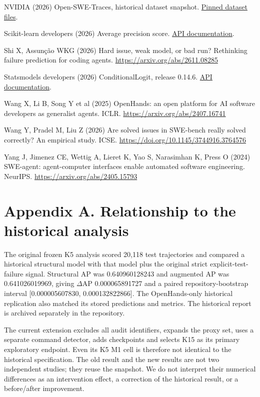 \documentclass[10pt,a4paper]{article}
\begin{document}
NVIDIA (2026) Open-SWE-Traces, historical dataset snapshot. \href{https://huggingface.co/datasets/nvidia/Open-SWE-Traces/tree/c144d9d160dcd9f5ebcd9520d2d54111dda8b681}{Pinned dataset files}.

Scikit-learn developers (2026) Average precision score. \href{https://scikit-learn.org/stable/modules/generated/sklearn.metrics.average_precision_score.html}{API documentation}.

Shi X, Assun\c{c}\~ao WKG (2026) Hard issue, weak model, or bad run? Rethinking failure prediction for coding agents. \url{https://arxiv.org/abs/2611.08285}

Statsmodels developers (2026) ConditionalLogit, release 0.14.6. \href{https://www.statsmodels.org/v0.14.6/generated/statsmodels.discrete.conditional_models.ConditionalLogit.html}{API documentation}.

Wang X, Li B, Song Y et al (2025) OpenHands: an open platform for AI software developers as generalist agents. ICLR. \url{https://arxiv.org/abs/2407.16741}

Wang Y, Pradel M, Liu Z (2026) Are solved issues in SWE-bench really solved correctly? An empirical study. ICSE. \url{https://doi.org/10.1145/3744916.3764576}

Yang J, Jimenez CE, Wettig A, Lieret K, Yao S, Narasimhan K, Press O (2024) SWE-agent: agent-computer interfaces enable automated software engineering. NeurIPS. \url{https://arxiv.org/abs/2405.15793}

\section{Appendix A. Relationship to the historical analysis}
The original frozen K5 analysis scored 20,118 test trajectories and compared a historical structural model with that model plus the original strict explicit-test-failure signal. Structural AP was 0.640960128243 and augmented AP was 0.641026019969, giving $\Delta$AP 0.000065891727 and a paired repository-bootstrap interval [0.000005607830, 0.000132822866]. The OpenHands-only historical replication also matched its stored predictions and metrics. The historical report is archived separately in the repository.

The current extension excludes all audit identifiers, expands the proxy set, uses a separate command detector, adds checkpoints and selects K15 as its primary exploratory endpoint. Even its K5 M1 cell is therefore not identical to the historical specification. The old result and the new results are not two independent studies; they reuse the snapshot. We do not interpret their numerical differences as an intervention effect, a correction of the historical result, or a before/after improvement.
\end{document}
